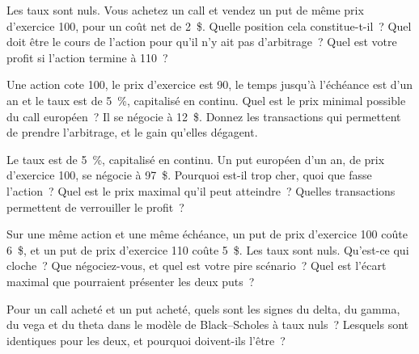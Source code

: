 \begin{question}\label{iq:iv2:options-parity-and-greeks:4}
Les taux sont nuls. Vous achetez un call et vendez un put de même prix d'exercice 100, pour un coût net de 2~\$. Quelle position cela constitue-t-il~? Quel doit être le cours de l'action pour qu'il n'y ait pas d'arbitrage~? Quel est votre profit si l'action termine à 110~?
\end{question}

\begin{question}\label{iq:iv2:options-parity-and-greeks:5}
Une action cote 100, le prix d'exercice est 90, le temps jusqu'à l'échéance est d'un an et le taux est de 5~\%, capitalisé en continu. Quel est le prix minimal possible du call européen~? Il se négocie à 12~\$. Donnez les transactions qui permettent de prendre l'arbitrage, et le gain qu'elles dégagent.
\end{question}

\begin{question}\label{iq:iv2:options-parity-and-greeks:6}
Le taux est de 5~\%, capitalisé en continu. Un put européen d'un an, de prix d'exercice 100, se négocie à 97~\$. Pourquoi est-il trop cher, quoi que fasse l'action~? Quel est le prix maximal qu'il peut atteindre~? Quelles transactions permettent de verrouiller le profit~?
\end{question}

\begin{question}\label{iq:iv2:options-parity-and-greeks:7}
Sur une même action et une même échéance, un put de prix d'exercice 100 coûte 6~\$, et un put de prix d'exercice 110 coûte 5~\$. Les taux sont nuls. Qu'est-ce qui cloche~? Que négociez-vous, et quel est votre pire scénario~? Quel est l'écart maximal que pourraient présenter les deux puts~?
\end{question}

\begin{question}\label{iq:iv2:options-parity-and-greeks:8}
Pour un call acheté et un put acheté, quels sont les signes du delta, du gamma, du vega et du theta dans le modèle de Black--Scholes à taux nuls~? Lesquels sont identiques pour les deux, et pourquoi doivent-ils l'être~?
\end{question}

